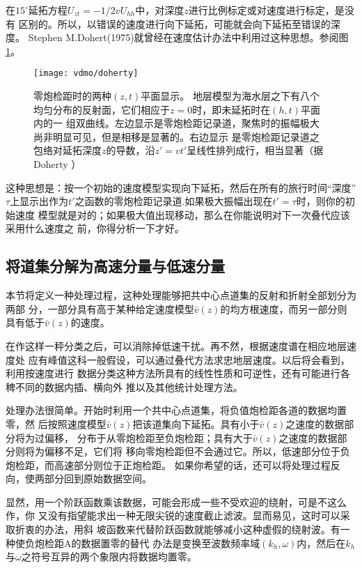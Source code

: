在$15^\circ$延拓方程$U_{zt}=-1/2vU_{hh}$中，对深度$z$进行比例标定或对速度进行标定，是没有
区别的。所以，以错误的速度进行向下延拓，可能就会向下延拓至错误的深度。
Stephen M.Dohert(1975)就曾经在速度估计办法中利用过这种思想。参阅图\ref{fig:vdmo/doherty}。

\begin{figure}[H]
\centering
\texttt{[image: vdmo/doherty]}
\caption[doherty]{零炮检距时的两种$(z,t)$平面显示。
地层模型为海水层之下有八个均匀分布的反射面，它们相应于$z=0$时，即未延拓时在$(h,t)$平面内的一
组双曲线。左边显示是零炮检距记录道，聚焦时的振幅极大尚非明显可见，但是相移是显著的。右边显示
是零炮检距记录道之包络对延拓深度$z$的导数，沿$z'=vt'$呈线性排列成行，相当显著（据Doherty
）}
\label{fig:vdmo/doherty}
\end{figure}

这种思想是：按一个初始的速度模型实现向下延拓，然后在所有的旅行时间“深度”
$\tau$上显示出作为$t'$之函数的零炮检距记录道.如果极大振幅出现在$t'=\tau$时，则你的初始速度
模型就是对的；如果极大值出现移动，那么在你能说明对下一次叠代应该采用什么速度之
前，你得分析一下才好。

\subsection{将道集分解为高速分量与低速分量}
\label{sec:3.5.9}

本节将定义一种处理过程，这种处理能够把共中心点道集的反射和折射全部划分为两部
分，一部分具有高于某种给定速度模型$\bar{v}(z)$的均方根速度，而另一部分则具有低于$\bar{v}(z)$的速度。

在作这样一秤分类之后，可以消除掉低速干扰。再不然，根据速度谱在相应地层速度处
应有峰值这科一般假设，可以通过叠代方法求忠地层速度。以后将会看到，利用按速度进行
数据分类这种方法所具有的线性性质和可逆性，还有可能进行各稗不同的数据内插、横向外
推以及其他统计处理方法。

处理办法很简单。开始时利用一个共中心点道集，将负值炮检距各道的数据均置零，然
后按照速度模型$\bar{v}(z)$把该道集向下延拓。具有小于$\bar{v}(z)$之速度的数据部分将为过偏移，
分布于从零炮检距至负炮检距；具有大于$\bar{v}(z)$之速度的数据部分则将为偏移不足，它们将
移向零炮检距但不会通过它。所以，低速部分位于负炮检距，而高速部分则位于正炮检距。
如果你希望的话，还可以将处理过程反向，使两部分回到原始数据空间。

显然，用一个阶跃函数乘该数据，可能会形成一些不受欢迎的绕射，可是不这么作，你
又没有指望能求出一种无限尖锐的速度截止滤波。显而易见，这时可以采取折衷的办法，用斜
坡函数来代替阶跃函数就能够减小这种虚假的绕射波。有一种使负炮检距A的数据置零的替代
办法是变换至波数频率域$(k_h,\omega)$内，然后在$k_h$与$\omega$之符号互异的两个象限内将数据均置零。

